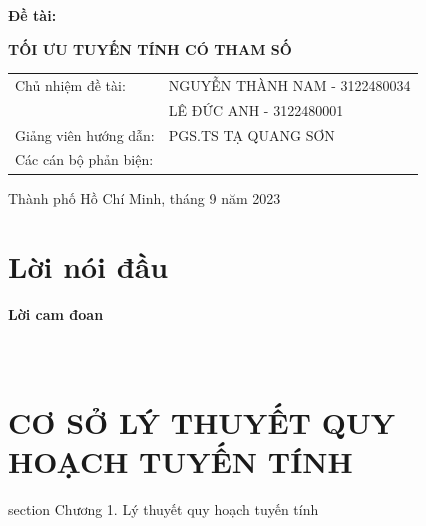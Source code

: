 \documentclass{article}
\begin{document}
\begin{titlepage}
\begin{center}
                \end{center}
                \begin{center}
                \hspace{15pt}\textbf{\fontsize{30pt}{0pt}\selectfont Đề tài:}
                \end{center}
                \begin{center}
                    \begin{center}
                \textbf{\fontsize{20pt}{0pt}\selectfont TỐI ƯU TUYẾN TÍNH CÓ THAM SỐ} 
                    \end{center}
                \vspace{1cm}
                \begin{table}[H]
                    \centering
                    \begin{tabular}{l l}
                \fontsize{14pt}{0pt}\selectfont Chủ nhiệm đề tài:     & \fontsize{14pt}{0pt}\selectfont NGUYỄN THÀNH NAM - 3122480034 \vspace{6pt}\\     
                  & \fontsize{14pt}{0pt}\selectfont LÊ ĐỨC ANH - 3122480001 \vspace{6pt}\\
                \fontsize{14pt}{0pt}\selectfont Giảng viên hướng dẫn: & \fontsize{14pt}{0pt}\selectfont PGS.TS TẠ QUANG SƠN \vspace{6pt}\\
                \fontsize{14pt}{0pt}\selectfont Các cán bộ phản biện:
                
               
                \end{tabular}
                \end{table}
                \vspace{-0.5cm}
                \fontsize{14pt}{0pt}\selectfont Thành phố Hồ Chí Minh, tháng 9 năm 2023
                \end{center}
            \end{titlepage}
            \cleardoublepage
\tableofcontents
\section*{\textbf{\fontsize{25}{25}\selectfont Lời nói đầu}}

\begin{center}
\textbf{\fontsize{25}{25}\selectfont Lời cam đoan}
\end{center}
\cleardoublepage
\section*{\\
\centering
\vspace{0.5cm}
CƠ SỞ LÝ THUYẾT QUY HOẠCH TUYẾN TÍNH}
 {section} {Chương 1. Lý thuyết quy hoạch tuyến tính}
\end{document}
